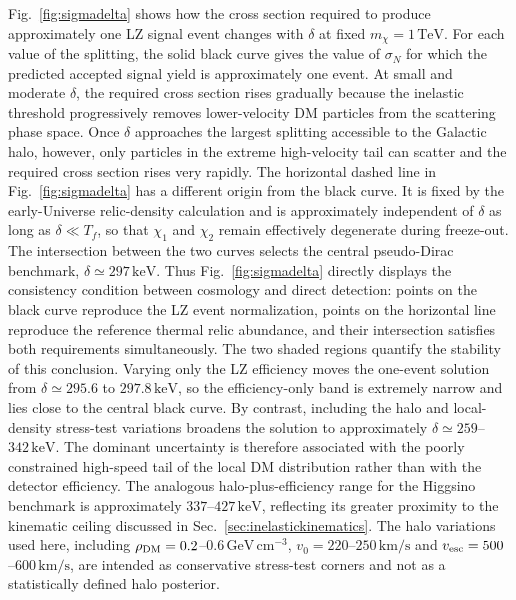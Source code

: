 \documentclass[aps,prd,reprint,superscriptaddress,nofootinbib,longbibliography,floatfix]{revtex4-2}
\newcommand{\GeV}{\mathrm{GeV}}
\newcommand{\TeV}{\mathrm{TeV}}
\newcommand{\keV}{\mathrm{keV}}
\begin{document}
Fig.~\ref{fig:sigmadelta} shows how the cross section required to produce approximately one LZ signal event changes with $\delta$ at fixed $m_\chi=1\,\TeV$. For each value of the splitting, the solid black curve gives the value of $\sigma_N$ for which the predicted accepted signal yield is approximately one event. At small and moderate $\delta$, the required cross section rises gradually because the inelastic threshold progressively removes lower-velocity DM particles from the scattering phase space. Once $\delta$ approaches the largest splitting accessible to the Galactic halo, however, only particles in the extreme high-velocity tail can scatter and the required cross section rises very rapidly.
The horizontal dashed line in Fig.~\ref{fig:sigmadelta} has a different origin from the black curve. It is fixed by the early-Universe relic-density calculation and is approximately independent of $\delta$ as long as $\delta\ll T_f$, so that $\chi_1$ and $\chi_2$ remain effectively degenerate during freeze-out. The intersection between the two curves selects the central pseudo-Dirac benchmark, $\delta\simeq297\,\keV$. Thus Fig.~\ref{fig:sigmadelta} directly displays the consistency condition between cosmology and direct detection: points on the black curve reproduce the LZ event normalization, points on the horizontal line reproduce the reference thermal relic abundance, and their intersection satisfies both requirements simultaneously.
The two shaded regions quantify the stability of this conclusion. Varying only the LZ efficiency moves the one-event solution from $\delta\simeq295.6$ to $297.8\,\keV$, so the efficiency-only band is extremely narrow and lies close to the central black curve. By contrast, including the halo and local-density stress-test variations broadens the solution to approximately $\delta\simeq259$--$342\,\keV$. The dominant uncertainty is therefore associated with the poorly constrained high-speed tail of the local DM distribution rather than with the detector efficiency. The analogous halo-plus-efficiency range for the Higgsino benchmark is approximately $337$--$427\,\keV$, reflecting its greater proximity to the kinematic ceiling discussed in Sec.~\ref{sec:inelastickinematics}. The halo variations used here, including $\rho_{\rm DM}=0.2$--$0.6\,\GeV\,\mathrm{cm}^{-3}$, $v_0=220$--$250\,\mathrm{km/s}$ and $v_{\rm esc}=500$--$600\,\mathrm{km/s}$, are intended as conservative stress-test corners and not as a statistically defined halo posterior.
\end{document}
